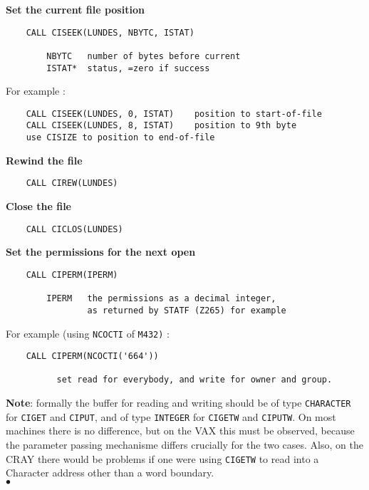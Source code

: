 {\bf Set the current file position}
\begin{verbatim}
    CALL CISEEK(LUNDES, NBYTC, ISTAT)
 
        NBYTC   number of bytes before current
        ISTAT*  status, =zero if success
\end{verbatim}
   For example :
\begin{verbatim}
    CALL CISEEK(LUNDES, 0, ISTAT)    position to start-of-file
    CALL CISEEK(LUNDES, 8, ISTAT)    position to 9th byte
    use CISIZE to position to end-of-file
\end{verbatim}
 
{\bf Rewind the file}
\begin{verbatim}
    CALL CIREW(LUNDES)
\end{verbatim}
 
{\bf Close the file}
\begin{verbatim}
    CALL CICLOS(LUNDES)
\end{verbatim}
 
{\bf Set the permissions for the next open}
\begin{verbatim}
    CALL CIPERM(IPERM)
 
        IPERM   the permissions as a decimal integer,
                as returned by STATF (Z265) for example
\end{verbatim}
   For example (using {\tt NCOCTI} of {\tt M432)} :
\begin{verbatim}
    CALL CIPERM(NCOCTI('664'))
 
          set read for everybody, and write for owner and group.
\end{verbatim}
{\bf Note}: formally the buffer for reading and writing should be of
type {\tt CHARACTER} for {\tt CIGET} and {\tt CIPUT},
and of type {\tt INTEGER} for {\tt CIGETW} and {\tt CIPUTW}.
On most machines there is no difference, but on the
VAX this must be observed, because the parameter passing mechanisme
differs crucially for the two cases. Also, on the CRAY there would
be problems if one were using {\tt CIGETW} to read
into a Character address other than a word boundary.
\\ $\bullet$
